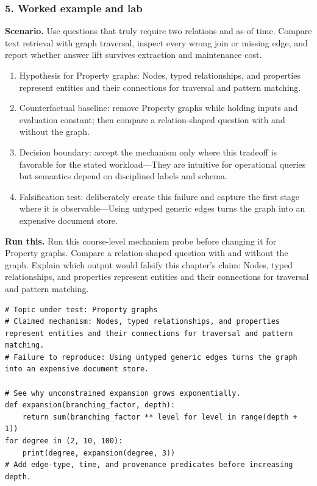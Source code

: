 \subsubsection*{5. Worked example and lab}
\textbf{Scenario.} Use questions that truly require two relations and as-of time. Compare text retrieval with graph traversal, inspect every wrong join or missing edge, and report whether answer lift survives extraction and maintenance cost.
\begin{enumerate}
\item Hypothesis for Property graphs: Nodes, typed relationships, and properties represent entities and their connections for traversal and pattern matching.
\item Counterfactual baseline: remove Property graphs while holding inputs and evaluation constant; then compare a relation-shaped question with and without the graph.
\item Decision boundary: accept the mechanism only where this tradeoff is favorable for the stated workload—They are intuitive for operational queries but semantics depend on disciplined labels and schema.
\item Falsification test: deliberately create this failure and capture the first stage where it is observable—Using untyped generic edges turns the graph into an expensive document store.
\end{enumerate}
\textbf{Run this.} Run this course-level mechanism probe before changing it for Property graphs. Compare a relation-shaped question with and without the graph. Explain which output would falsify this chapter's claim: Nodes, typed relationships, and properties represent entities and their connections for traversal and pattern matching.
\begin{Verbatim}[fontsize=\scriptsize]
# Topic under test: Property graphs
# Claimed mechanism: Nodes, typed relationships, and properties represent entities and their connections for traversal and pattern matching.
# Failure to reproduce: Using untyped generic edges turns the graph into an expensive document store.

# See why unconstrained expansion grows exponentially.
def expansion(branching_factor, depth):
    return sum(branching_factor ** level for level in range(depth + 1))
for degree in (2, 10, 100):
    print(degree, expansion(degree, 3))
# Add edge-type, time, and provenance predicates before increasing depth.
\end{Verbatim}
